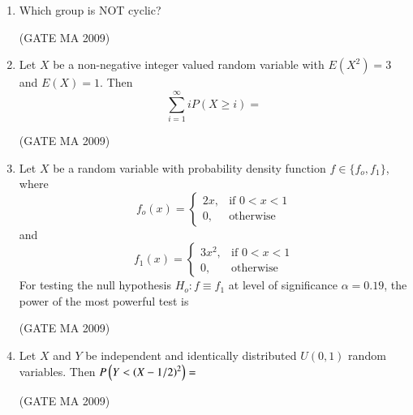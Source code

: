 \documentclass[journal,12pt,onecolumn]{IEEEtran}
\theoremstyle{remark}
\begin{document}
\begin{enumerate}[leftmargin=0pt, align=left, start=21]
\item Which group is NOT cyclic?
\begin{enumerate}
\end{enumerate}
\hfill (GATE MA 2009)

\item Let $X$ be a non-negative integer valued random variable with $E(X^2)=3$ and $E(X)=1$. Then
$$
\sum_{i=1}^\infty i P(X\geq i) =
$$
\begin{enumerate}
\end{enumerate}
\hfill (GATE MA 2009)

\item Let $X$ be a random variable with probability density function $f\in\{f_o,f_1\}$, where 
$$
f_o(x)=
\begin{cases}
2x,& \text{if } 0<x<1\\
0,& \text{otherwise}
\end{cases}
$$
and
$$
f_1(x)=
\begin{cases}
3x^2,&\text{if } 0<x<1\\
0,& \text{otherwise}
\end{cases}
$$
For testing the null hypothesis $H_o:f\equiv f_1$ at level of significance $\alpha=0.19$, the power of the most powerful test is 
\begin{enumerate}
\end{enumerate}
\hfill (GATE MA 2009)

\item Let $X$ and $Y$ be independent and identically distributed $U(0,1)$ random variables. Then $P\left(Y <\left(X-1/2\right)^2\right)=$
\begin{enumerate}
\end{enumerate}
\hfill (GATE MA 2009)


\end{enumerate}
\end{document}
